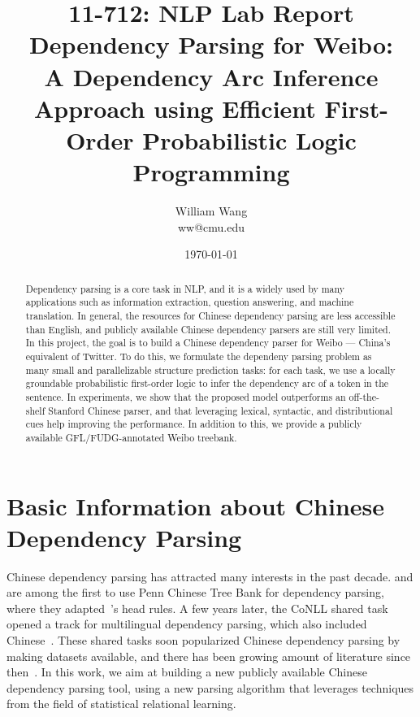 \documentclass[11pt,letterpaper]{article}
\title{11-712:  NLP Lab Report\\
\textbf{Dependency Parsing for Weibo:\\
A Dependency Arc Inference Approach using Efficient First-Order Probabilistic Logic Programming}}
\author{William Wang\\
ww@cmu.edu}
\date{\today}
\begin{document}
\maketitle
\begin{abstract}
Dependency parsing is a core task in NLP, and it is a widely used by many applications such as information extraction,
question answering, and machine translation. In general, the resources for Chinese dependency parsing are less accessible than English, and publicly available Chinese dependency parsers are still very limited. In this project, the goal is to build a Chinese dependency parser for Weibo --- China's equivalent of Twitter. 
To do this, we formulate the dependeny parsing problem as many small and parallelizable structure prediction tasks:
for each task, we use a locally groundable probabilistic first-order logic to infer the dependency arc of a token in the sentence.
In experiments, we show that the proposed model outperforms an off-the-shelf Stanford Chinese parser,
and that leveraging lexical, syntactic, and distributional cues help improving the performance.
In addition to this, we provide a publicly available GFL/FUDG-annotated Weibo treebank.

\end{abstract}

\section{Basic Information about Chinese Dependency Parsing}
\label{sec:info}
Chinese dependency parsing has attracted many interests in the past decade.
\cite{bikel2000two} and \citet{Chiang:2002} are among the first to use Penn Chinese Tree Bank for dependency parsing,
where they adapted~\cite{xia1999extracting}'s head rules.
A few years later, the CoNLL shared task opened a track for multilingual dependency parsing,
which also included Chinese~\citep{buchholz2006conll,nilsson2007conll}.
These shared tasks soon popularized Chinese dependency parsing by making datasets available,
and there has been growing amount of literature since then~\citep{zhang2008tale,nivre2007maltparser,sagae2007dependency,
che2010ltp,carreras2007experiments,duan2007probabilistic}.
In this work, we aim at building a new publicly available Chinese dependency parsing tool, using 
a new parsing algorithm that leverages techniques from the field of statistical relational learning.
\end{document}
